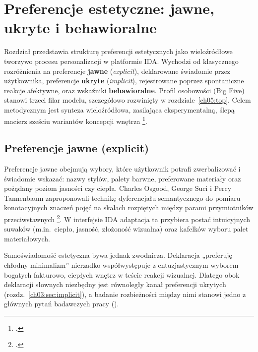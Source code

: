 \chapter{Preferencje estetyczne: jawne, ukryte i behawioralne}
\label{ch03:top}

Rozdział przedstawia strukturę preferencji estetycznych jako wieloźródłowe tworzywo procesu personalizacji w platformie IDA.
Wychodzi od klasycznego rozróżnienia na preferencje \textbf{jawne} (\emph{explicit}), deklarowane świadomie przez użytkownika, preferencje \textbf{ukryte} (\emph{implicit}), rejestrowane poprzez spontaniczne reakcje afektywne, oraz wskaźniki \textbf{behawioralne}. Profil osobowości (Big Five) stanowi trzeci filar modelu, szczegółowo rozwinięty w rozdziale~\ref{ch05:top}.
Celem metodycznym jest synteza wieloźródłowa, zasilająca eksperymentalną, ślepą macierz sześciu wariantów koncepcji wnętrza \footcite{idaPlatform2026}.

\section{Preferencje jawne (explicit)}
\label{ch03:sec:explicit}

Preferencje jawne obejmują wybory, które użytkownik potrafi zwerbalizować i świadomie wskazać: nazwy stylów, palety barwne, preferowane materiały oraz pożądany poziom jasności czy ciepła.
Charles Osgood, George Suci i Percy Tannenbaum zaproponowali technikę dyferencjału semantycznego do pomiaru konotacyjnych znaczeń pojęć na skalach rozpiętych między parami przymiotników przeciwstawnych \footcite{osgood1957measurement}.
W interfejsie IDA adaptacja ta przybiera postać intuicyjnych suwaków (m.in.\ ciepło, jasność, złożoność wizualna) oraz kafelków wyboru palet materiałowych.

Samoświadomość estetyczna bywa jednak zwodnicza. Deklaracja „preferuję chłodny minimalizm” nierzadko współwystępuje z entuzjastycznym wyborem bogatych fakturowo, ciepłych wnętrz w teście reakcji wizualnej. Dlatego obok deklaracji słownych niezbędny jest równoległy kanał preferencji ukrytych (rozdz.~\ref{ch03:sec:implicit}), a badanie rozbieżności między nimi stanowi jedno z głównych pytań badawczych pracy ().

